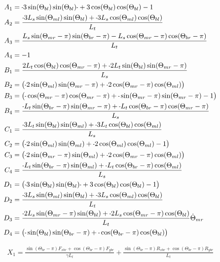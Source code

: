 \documentclass[11pt, landscape]{article}
\newcommand{\mn}{\scalebox{0.7}[1.0]{-}}
\begin{document}
\begin{align}
  A_1 &= \mn 3\sin(\Theta_{bl})\sin(\Theta_{bl})\mn + 3\cos(\Theta_{bl})\cos(\Theta_{bl}) -1 \\
  A_2 &= \frac{\mn 3L_{s}\sin(\Theta_{ml})\sin(\Theta_{bl}) + \mn 3L_{s}\cos(\Theta_{ml})\cos(\Theta_{bl})}{L_t} \\
  A_3 &= \frac{L_{s}\sin(\Theta_{mr}-\pi)\sin(\Theta_{br}-\pi) - L_{s}\cos(\Theta_{mr}-\pi)\cos(\Theta_{br}-\pi)}{L_{t}} \\
  A_4 &= -1 \\
  B_1 &= \frac{2L_{t}\cos(\Theta_{bl})\cos(\Theta_{mr}-\pi) + \mn 2L_{t}\sin(\Theta_{bl})\sin(\Theta_{mr}-\pi)}{L_{s}} \\
  B_2 &= \big(\mn 2\sin(\Theta_{ml})\sin(\Theta_{mr}-\pi) + \mn 2\cos(\Theta_{mr}-\pi)\cos(\Theta_{ml}) \big) \\
  B_3 &= \big( \mn \cos(\Theta_{mr}-\pi)\cos(\Theta_{mr}-\pi) + \mn\sin(\Theta_{mr}-\pi)\sin(\Theta_{mr}-\pi) - 1\big) \\
  B_4 &= \frac{\mn L_{t}\sin(\Theta_{br}-\pi)\sin(\Theta_{mr}-\pi) + \mn L_{t}\cos(\Theta_{br}-\pi)\cos(\Theta_{mr}-\pi)}{L_{s}} \\
  C_1 &= \frac{\mn 3L_{t}\sin(\Theta_{bl})\sin(\Theta_{ml}) + \mn3L_{t}\cos(\Theta_{bl})\cos(\Theta_{ml})}{L_s} \\
  C_2 &= \big(\mn 2\sin(\Theta_{ml})\sin(\Theta_{ml}) + \mn 2\cos(\Theta_{ml})\cos(\Theta_{ml}) - 1\big) \\
  C_3 &= \big(\mn 2\sin(\Theta_{mr}-\pi)\sin(\Theta_{ml}) + \mn 2\cos(\Theta_{mr}-\pi)\cos(\Theta_{ml}) \big) \\
  C_4 &= \frac{\mn L_{t}\sin(\Theta_{br}-\pi)\sin(\Theta_{ml}) + \mn L_{t}\cos(\Theta_{br}-\pi)\cos(\Theta_{ml})}{L_s} \\
  D_1 &= \big(\mn 3\sin(\Theta_{bl})\sin(\Theta_{bl})\mn + 3\cos(\Theta_{bl})\cos(\Theta_{bl}) -1\big) \\
  D_2 &= \frac{\mn 3L_{s}\sin(\Theta_{ml})\sin(\Theta_{bl}) + \mn 3L_{s}\cos(\Theta_{ml})\cos(\Theta_{bl})}{L_t} \\
  D_3 &= \frac{\mn 2L_{s}\sin(\Theta_{mr}-\pi)\sin(\Theta_{bl}) + \mn 2L_{s}\cos(\Theta_{mr}-\pi)\cos(\Theta_{bl})}{L_t}\dot{\Theta}_{mr} \\
  D_4 &= \big(\mn \sin(\Theta_{bl}) \sin(\Theta_{br}-\pi) + \mn \cos(\Theta_{br}-\pi)\cos(\Theta_{bl})\big) \\
\end{align}

\begin{multline}
  X_1 = \frac{\sin(\Theta_{br}-\pi)F_{xbr} + \cos(\Theta_{br}-\pi)F_{ybr}}{\gamma L_{t}} + \frac{\sin(\Theta_{br}-\pi)R_{xbr} + \cos(\Theta_{br}-\pi)R_{ybr}}{L_{t}} \\
\end{multline}
\end{document}
